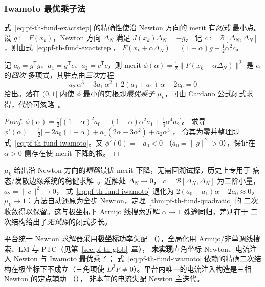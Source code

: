 \subsubsection{Iwamoto 最优乘子法}
式~\eqref{eq:pf-th-fund-exactstep} 的精确性使沿 Newton 方向的 merit 有\emph{闭式}
最小点。设 $g:=F(x_k)$，Newton 方向 $\Delta_N$ 满足 $J(x_k)\Delta_N=-g$，
记 $c:=\mathcal B[\Delta_N,\Delta_N]$，则由式~\eqref{eq:pf-th-fund-exactstep}，
$F(x_k+\alpha\Delta_N)=(1-\alpha)g+\tfrac12\alpha^2c$。

\begin{proposition}[最优乘子的三次方程]\label{prop:pf-th-fund-iwamoto}
记 $a_0=g^{\mathsf T}g$、$a_1=g^{\mathsf T}c$、$a_2=c^{\mathsf T}c$，则 merit
$\phi(\alpha)=\tfrac12\lVert F(x_k+\alpha\Delta_N)\rVert^2$ 是 $\alpha$ 的\emph{四次}
多项式，其驻点由\emph{三次}方程
\begin{equation}
a_2\,\alpha^3-3a_1\,\alpha^2+2(a_0+a_1)\,\alpha-2a_0=0
\label{eq:pf-th-fund-iwamoto}
\end{equation}
给出。落在 $(0,1]$ 内使 $\phi$ 最小的实根即\emph{最优乘子} $\mu_k$，可由 Cardano
公式闭式求得，代价可忽略~\cite{pff:iwamoto}。
\end{proposition}
\begin{proof}
$\phi(\alpha)=\tfrac12\bigl[(1-\alpha)^2a_0+(1-\alpha)\alpha^2a_1+\tfrac14\alpha^4a_2\bigr]$。
求导 $\phi'(\alpha)=\tfrac12\bigl[-2a_0(1-\alpha)+a_1(2\alpha-3\alpha^2)+a_2\alpha^3\bigr]$，
令其为零并整理即式~\eqref{eq:pf-th-fund-iwamoto}。又 $\phi'(0)=-a_0<0$
（$a_0=\lVert g\rVert^2>0$），保证在 $\alpha>0$ 侧存在使 merit 下降的根。
\end{proof}

\begin{remark}[最优乘子的全局化意义与渐近还原]\label{rem:pf-th-fund-iwamoto}
$\mu_k$ 给出沿 Newton 方向的\emph{精确}最优 merit 下降，无需回溯试探，历史上专用于
病态/发散边缘系统的稳健求解~\cite{pff:iwamoto}。近解处 $\Delta_N\to0$，
$c=\mathcal B[\Delta_N,\Delta_N]$ 为二阶小量，$a_2=\lVert c\rVert^2\to0$，
式~\eqref{eq:pf-th-fund-iwamoto} 退化为 $2(a_0+a_1)\alpha-2a_0\approx0$，
$\mu_k\to1$：方法自动还原为全步 Newton，定理~\ref{thm:pf-th-fund-quadratic} 的
二次收敛得以保留。这与极坐标下 Armijo 线搜索近解 $\alpha\to1$ 殊途同归，差别在于
二次结构给出了\emph{无试探}的闭式步长。
\end{remark}

\begin{gapnote}
平台统一 Newton 求解器采用\textbf{极坐标}功率失配
（），全局化用
Armijo/非单调线搜索、LM 与 PTC（见第~\ref{sec:pf-th-glob}~章），
\textbf{未实现}直角坐标 Newton、电流注入 Newton 与 Iwamoto 最优乘子；
式~\eqref{eq:pf-th-fund-iwamoto} 依赖的精确二次结构在极坐标下不成立（三角项使
$D^3F\ne0$）。平台内唯一的电流注入构造是三相 Newton 的定点辅助
（），
非本节的电流失配 Newton 主迭代。
\end{gapnote}
